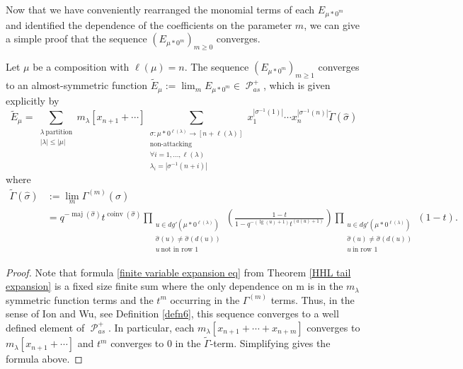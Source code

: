 \documentclass[ALCO,Unicode]{cedram}
\DeclareMathOperator{\sP}{\mathscr{P} }
\DeclareMathOperator{\maj}{maj}
\DeclareMathOperator{\coinv}{coinv}
\DeclareMathOperator{\mathleg}{lg}
\begin{document}
Now that we have conveniently rearranged the monomial terms of each $E_{\mu*0^m}$ and identified the dependence of the coefficients on the parameter $m$, we can give a simple proof that the sequence $(E_{\mu*0^m})_{m \geq 0}$ converges.

\begin{coro}\label{convergence of macdonald}


Let $\mu$ be a composition with $\ell(\mu) = n$. The sequence $(E_{\mu * 0^m})_{m \geq 1}$ converges to an almost-symmetric function $\widetilde{E}_{\mu}:= \lim_{m} E_{\mu * 0^m} \in \sP_{as}^{+}$, which is given explicitly by 
\begin{equation}
       \widetilde{E}_{\mu} = 
        \sum_{\substack{\lambda ~ \text{partition}  \\ |\lambda| \leq |\mu|}} m_{\lambda}[x_{n+1}+ \cdots] \sum_{\substack{\sigma:\mu * 0^{\ell(\lambda)} \rightarrow [n+\ell(\lambda)]\\ \text{non-attacking} \\ \forall i = 1,\ldots,\ell(\lambda) \\ \lambda_i = |\sigma^{-1}(n+i)|}} x_1 ^{|\sigma^{-1}(1)|}\cdots x_n ^{|\sigma^{-1}(n)|} \widetilde{\Gamma}(\widehat{\sigma})
\end{equation}
%
where 
%
\begin{align*}
\widetilde{\Gamma}(\widehat{\sigma}) & := \lim_{m} \Gamma^{(m)}(\widehat{\sigma}) \\
&= q^{-\maj(\widehat{\sigma})}t^{\coinv(\widehat{\sigma})} \prod_{\substack{ u \in dg'(\mu * 0^{\ell(\lambda)}) \\ \widehat{\sigma}(u) \neq \widehat{\sigma}(d(u)) \\ u ~ \text{not in row } 1 }} \left( \frac{1-t}{1-q^{-(\mathleg(u)+1)}t^{(a(u)+1)}} \right) \prod_{\substack{ u \in dg'(\mu * 0^{\ell(\lambda)}) \\ \widehat{\sigma}(u) \neq \widehat{\sigma}(d(u)) \\ u ~ \text{in row } 1 }} \left( 1-t \right).
\end{align*}
\end{coro}


\begin{proof}
Note that formula \eqref{finite variable expansion eq} from Theorem \ref{HHL tail expansion} is a fixed size finite sum where the only dependence on m is in the $m_{\lambda}$ symmetric function terms and the $t^m$ occurring in the $\Gamma^{(m)}$ terms. Thus, in the sense of Ion and Wu, see Definition \ref{defn6}, this sequence converges to a well defined element of $\sP_{as}^{+}$. In particular, each $m_{\lambda}[x_{n+1}+\cdots +x_{n+m}]$ converges to $m_{\lambda}[x_{n+1}+ \cdots]$ and $t^m$ converges to 0 in the $\widetilde{\Gamma}$-term. Simplifying gives the formula above. 
\end{proof}
\end{document}
